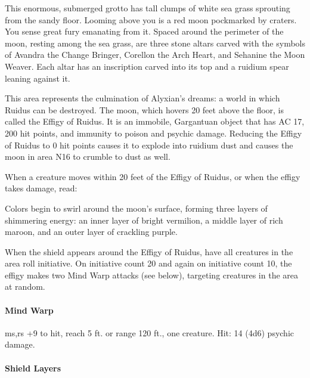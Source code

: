 \documentclass[letterpaper, 11pt, bg=full, twocolumn]{dndbook}
\begin{document}
\begin{DndReadAloud}
This enormous, submerged grotto has tall clumps of white sea grass sprouting from the sandy floor. Looming above you is a red moon pockmarked by craters. You sense great fury emanating from it.
Spaced around the perimeter of the moon, resting among the sea grass, are three stone altars carved with the symbols of Avandra the Change Bringer, Corellon the Arch Heart, and Sehanine the Moon Weaver. Each altar has an inscription carved into its top and a ruidium spear leaning against it.
\end{DndReadAloud}

This area represents the culmination of Alyxian's dreams: a world in which Ruidus can be destroyed. The moon, which hovers 20 feet above the floor, is called the Effigy of Ruidus. It is an immobile, Gargantuan object that has AC 17, 200 hit points, and immunity to poison and psychic damage. Reducing the Effigy of Ruidus to 0 hit points causes it to explode into ruidium dust and causes the moon in area N16 to crumble to dust as well.

When a creature moves within 20 feet of the Effigy of Ruidus, or when the effigy takes damage, read:

\begin{DndReadAloud}
Colors begin to swirl around the moon's surface, forming three layers of shimmering energy: an inner layer of bright vermilion, a middle layer of rich maroon, and an outer layer of crackling purple.
\end{DndReadAloud}

When the shield appears around the Effigy of Ruidus, have all creatures in the area roll initiative. On initiative count 20 and again on initiative count 10, the effigy makes two Mind Warp attacks (see below), targeting creatures in the area at random.

\begin{DndSidebar}{}
\paragraph{Mind Warp}

ms,rs +9 to hit, reach 5 ft. or range 120 ft., one creature. Hit: 14 (4d6) psychic damage.
\end{DndSidebar}

\paragraph{Shield Layers}
\end{document}
